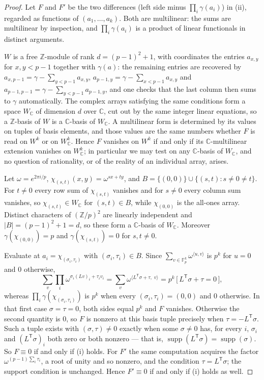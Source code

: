 \documentclass[10pt,a4paper]{amsart}
\newcommand{\CC}{\mathbb{C}}
\newcommand{\FF}{\mathbb{F}}
\newcommand{\ZZ}{\mathbb{Z}}
\newcommand{\supp}{\operatorname{supp}}
\newcommand{\tr}{\mathsf{T}}
\begin{document}
\begin{proof}
Let $F$ and $F'$ be the two differences (left side minus $\prod_i\gamma(a_i)$)
in (ii), regarded as functions of $(a_1,\dots,a_k)$. Both are multilinear: the
sums are multilinear by inspection, and $\prod_i\gamma(a_i)$ is a product of
linear functionals in distinct arguments.

$W$ is a free $\ZZ$-module of rank $d=(p-1)^2+1$, with coordinates the entries
$a_{x,y}$ for $x,y<p-1$ together with $\gamma(a)$: the remaining entries are
recovered by $a_{x,p-1}=\gamma-\sum_{y<p-1}a_{x,y}$,
$a_{p-1,y}=\gamma-\sum_{x<p-1}a_{x,y}$ and
$a_{p-1,p-1}=\gamma-\sum_{y<p-1}a_{p-1,y}$, and one checks that the last column
then sums to $\gamma$ automatically. The complex arrays satisfying the same
conditions form a space $W_\CC$ of dimension $d$ over $\CC$, cut out by the same
integer linear equations, so a $\ZZ$-basis of $W$ is a $\CC$-basis of $W_\CC$.
A multilinear form is determined by its values on tuples of basis elements, and
those values are the same numbers whether $F$ is read on $W^k$ or on $W_\CC^k$.
Hence $F$ vanishes on $W^k$ if and only if its $\CC$-multilinear extension
vanishes on $W_\CC^k$; in particular we may test on any $\CC$-basis of $W_\CC$,
and no question of rationality, or of the reality of an individual array, arises.

Let $\omega=e^{2\pi i/p}$, $\chi_{(s,t)}(x,y)=\omega^{sx+ty}$, and
$B=\{(0,0)\}\cup\{(s,t):s\ne0\ne t\}$. For $t\ne0$ every row sum of
$\chi_{(s,t)}$ vanishes and for $s\ne0$ every column sum vanishes, so
$\chi_{(s,t)}\in W_\CC$ for $(s,t)\in B$, while $\chi_{(0,0)}$ is the all-ones
array. Distinct characters of $(\ZZ/p)^2$ are linearly independent and
$|B|=(p-1)^2+1=d$, so these form a $\CC$-basis of $W_\CC$. Moreover
$\gamma(\chi_{(0,0)})=p$ and $\gamma(\chi_{(s,t)})=0$ for $s,t\ne0$.

Evaluate at $a_i=\chi_{(\sigma_i,\tau_i)}$ with $(\sigma_i,\tau_i)\in B$. Since
$\sum_{v\in\FF_p^k}\omega^{\langle u,v\rangle}$ is $p^k$ for $u=0$ and $0$
otherwise,
\[
\sum_{v}\prod_i\omega^{\sigma_i(Lv)_i+\tau_iv_i}
=\sum_{v}\omega^{\langle L^{\tr}\sigma+\tau,\;v\rangle}
=p^k\,\big[\,L^{\tr}\sigma+\tau=0\,\big],
\]
whereas $\prod_i\gamma(\chi_{(\sigma_i,\tau_i)})$ is $p^k$ when every
$(\sigma_i,\tau_i)=(0,0)$ and $0$ otherwise. In that first case
$\sigma=\tau=0$, both sides equal $p^k$ and $F$ vanishes. Otherwise the second
quantity is $0$, so $F$ is nonzero at this basis tuple precisely when
$\tau=-L^{\tr}\sigma$. Such a tuple exists with $(\sigma,\tau)\ne0$ exactly when
some $\sigma\ne0$ has, for every $i$, $\sigma_i$ and $(L^{\tr}\sigma)_i$ both
zero or both nonzero --- that is, $\supp(L^{\tr}\sigma)=\supp(\sigma)$. So
$F\equiv0$ if and only if (i) holds. For $F'$ the same computation acquires the
factor $\omega^{(p-1)\sum_i\tau_i}$, a root of unity and so nonzero, and the
condition $\tau=L^{\tr}\sigma$; the support condition is unchanged. Hence
$F'\equiv0$ if and only if (i) holds as well.
\end{proof}
\end{document}
